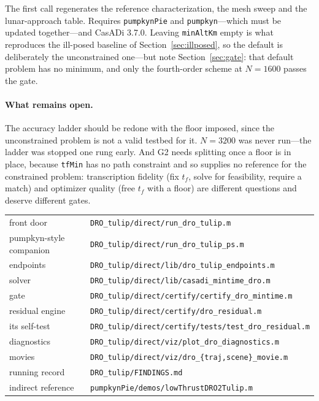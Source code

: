 \documentclass[11pt]{article}
\newcommand{\code}[1]{\texttt{#1}}
\begin{document}
The first call regenerates the reference characterization, the mesh sweep and
the lunar-approach table. Requires \code{pumpkynPie} and \code{pumpkyn}---which
must be updated together---and CasADi 3.7.0. Leaving \code{minAltKm} empty is
what reproduces the ill-posed baseline of Section~\ref{sec:illposed}, so the
default is deliberately the unconstrained one---but note
Section~\ref{sec:gate}: that default problem has no minimum, and only the
fourth-order scheme at $N = 1600$ passes the gate.

\paragraph{What remains open.} The accuracy ladder should be redone with the
floor imposed, since the unconstrained problem is not a valid testbed for it.
$N = 3200$ was never run---the ladder was stopped one rung early. And G2 needs
splitting once a floor is in place, because \code{tfMin} has no path constraint
and so supplies no reference for the constrained problem: transcription fidelity
(fix $t_f$, solve for feasibility, require a match) and optimizer quality (free
$t_f$ with a floor) are different questions and deserve different gates.

\begin{tabular}{ll}
\toprule
front door & \code{DRO\_tulip/direct/run\_dro\_tulip.m} \\
pumpkyn-style companion & \code{DRO\_tulip/direct/run\_dro\_tulip\_ps.m} \\
endpoints & \code{DRO\_tulip/direct/lib/dro\_tulip\_endpoints.m} \\
solver & \code{DRO\_tulip/direct/lib/casadi\_mintime\_dro.m} \\
gate & \code{DRO\_tulip/direct/certify/certify\_dro\_mintime.m} \\
residual engine & \code{DRO\_tulip/direct/certify/dro\_residual.m} \\
its self-test & \code{DRO\_tulip/direct/certify/tests/test\_dro\_residual.m} \\
diagnostics & \code{DRO\_tulip/direct/viz/plot\_dro\_diagnostics.m} \\
movies & \code{DRO\_tulip/direct/viz/dro\_\{traj,scene\}\_movie.m} \\
running record & \code{DRO\_tulip/FINDINGS.md} \\
indirect reference & \code{pumpkynPie/demos/lowThrustDRO2Tulip.m} \\
\bottomrule
\end{tabular}
\end{document}
